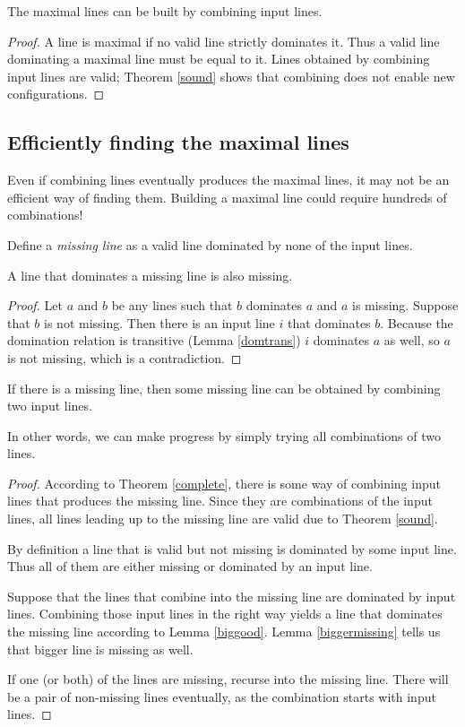 \documentclass[english, 12pt, a4paper, sci, a-1b, online]{aaltothesis}
\begin{document}
\begin{corollary}
The maximal lines can be built by combining input lines.
\end{corollary}

\begin{proof}
A line is maximal if no valid line strictly dominates it. Thus a valid line dominating a maximal line must be equal to it. Lines obtained by combining input lines are valid; Theorem \ref{sound} shows that combining does not enable new configurations.
\end{proof}

\subsection{Efficiently finding the maximal lines}

Even if combining lines eventually produces the maximal lines, it may not be an efficient way of finding them. Building a maximal line could require hundreds of combinations!

Define a \emph{missing line} as a valid line dominated by none of the input lines.

\begin{lemma}
\label{biggermissing}
A line that dominates a missing line is also missing.
\end{lemma}

\begin{proof}
Let $a$ and $b$ be any lines such that $b$ dominates $a$ and $a$ is missing. Suppose that $b$ is not missing. Then there is an input line $i$ that dominates $b$. Because the domination relation is transitive (Lemma \ref{domtrans}) $i$ dominates $a$ as well, so $a$ is not missing, which is a contradiction.
\end{proof}

\begin{theorem}
\label{justtwo}
If there is a missing line, then some missing line can be obtained by combining two input lines.
\end{theorem}

In other words, we can make progress by simply trying all combinations of two lines.

\begin{proof}
According to Theorem \ref{complete}, there is some way of combining input lines that produces the missing line. Since they are combinations of the input lines, all lines leading up to the missing line are valid due to Theorem \ref{sound}.

By definition a line that is valid but not missing is dominated by some input line. Thus all of them are either missing or dominated by an input line.

Suppose that the lines that combine into the missing line are dominated by input lines. Combining those input lines in the right way yields a line that dominates the missing line according to Lemma \ref{biggood}. Lemma \ref{biggermissing} tells us that bigger line is missing as well.

If one (or both) of the lines are missing, recurse into the missing line. There will be a pair of non-missing lines eventually, as the combination starts with input lines.
\end{proof}
\end{document}
